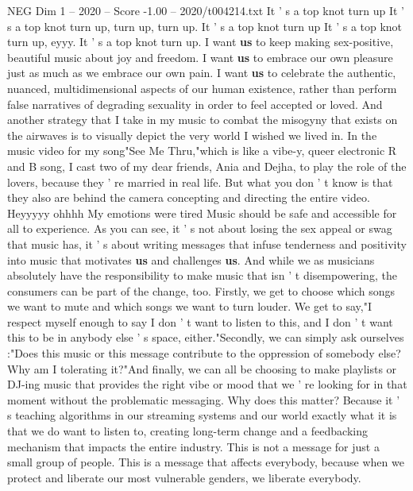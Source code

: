 \begin{textsample}{NEG Dim 1 – 2020 – Score -1.00 – 2020/t004214.txt}
It ' s a top knot turn up It ' s a top knot turn up, turn up, turn up.
It ' s a top knot turn up It ' s a top knot turn up, eyyy.
It ' s a top knot turn up.
I want \textbf{us} to keep making sex-positive, beautiful music about joy and freedom.
I want \textbf{us} to embrace our own pleasure just as much as we embrace our own pain.
I want \textbf{us} to celebrate the authentic, nuanced, multidimensional aspects of our human existence, rather than perform false narratives of degrading sexuality in order to feel accepted or loved.
And another strategy that I take in my music to combat the misogyny that exists on the airwaves is to visually depict the very world I wished we lived in.
In the music video for my song"See Me Thru,"which is like a vibe-y, queer electronic R and B song, I cast two of my dear friends, Ania and Dejha, to play the role of the lovers, because they ' re married in real life.
But what you don ' t know is that they also are behind the camera concepting and directing the entire video.
Heyyyyy ohhhh My emotions were tired Music should be safe and accessible for all to experience.
As you can see, it ' s not about losing the sex appeal or swag that music has, it ' s about writing messages that infuse tenderness and positivity into music that motivates \textbf{us} and challenges \textbf{us}.
And while we as musicians absolutely have the responsibility to make music that isn ' t disempowering, the consumers can be part of the change, too.
Firstly, we get to choose which songs we want to mute and which songs we want to turn louder.
We get to say,"I respect myself enough to say I don ' t want to listen to this, and I don ' t want this to be in anybody else ' s space, either."Secondly, we can simply ask ourselves :"Does this music or this message contribute to the oppression of somebody else?
Why am I tolerating it?"And finally, we can all be choosing to make playlists or DJ-ing music that provides the right vibe or mood that we ' re looking for in that moment without the problematic messaging.
Why does this matter?
Because it ' s teaching algorithms in our streaming systems and our world exactly what it is that we do want to listen to, creating long-term change and a feedbacking mechanism that impacts the entire industry.
This is not a message for just a small group of people.
This is a message that affects everybody, because when we protect and liberate our most vulnerable genders, we liberate everybody.

\end{textsample}
